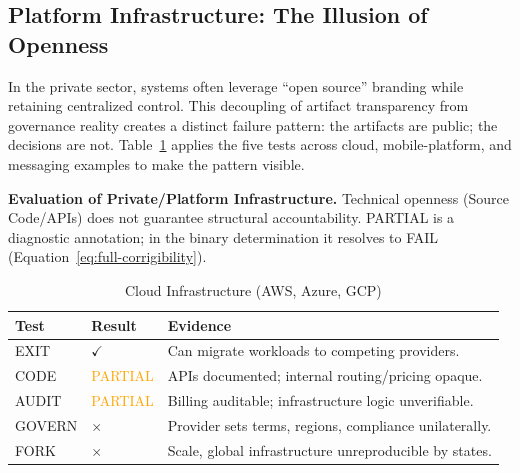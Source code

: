 \documentclass{article}
\begin{document}
\subsection{Platform Infrastructure: The Illusion of Openness}

In the private sector, systems often leverage ``open source'' branding while retaining centralized control. This decoupling of artifact transparency from governance reality creates a distinct failure pattern: the artifacts are public; the decisions are not. Table~\ref{tab:corp_infra} applies the five tests across cloud, mobile-platform, and messaging examples to make the pattern visible.

\begin{table}[htbp]
    \centering
    \scriptsize
    \caption{\textbf{Evaluation of Private/Platform Infrastructure.} Technical openness (Source Code/APIs) does not guarantee structural accountability. PARTIAL is a diagnostic annotation; in the binary determination it resolves to FAIL (Equation~\ref{eq:full-corrigibility}).}
    \label{tab:corp_infra}

    \begin{subtable}{1\textwidth}
        \centering
        \caption{Cloud Infrastructure (AWS, Azure, GCP)}
        \begin{tabular}{@{}llp{7cm}@{}}
            \toprule
            \textbf{Test} & \textbf{Result} & \textbf{Evidence} \\
            \midrule
            EXIT & $\checkmark$ & Can migrate workloads to competing providers. \\
            CODE & \textcolor{orange}{PARTIAL} & APIs documented; internal routing/pricing opaque. \\
            AUDIT & \textcolor{orange}{PARTIAL} & Billing auditable; infrastructure logic unverifiable. \\
            GOVERN & $\times$ & Provider sets terms, regions, compliance unilaterally. \\
            FORK & $\times$ & Scale, global infrastructure unreproducible by states. \\
            \bottomrule
        \end{tabular}
    \end{subtable}


\end{table}
\end{document}
